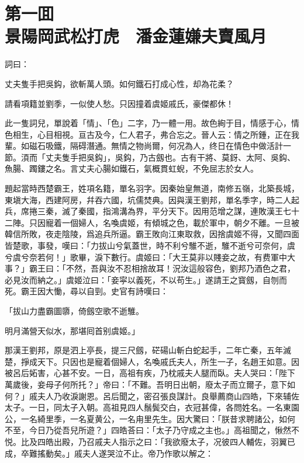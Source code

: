 
\chapter*{第一囬　\\景陽岡武松打虎　潘金蓮嫌夫賣風月}


詞曰：

\begin{myquote}
丈夫隻手把吳鈎，欲斬萬人頭。如何鐵石打成心性，却為花柔？

請看項籍並劉季，一似使人愁。只因撞着虞姬戚氏，豪傑都休！
\end{myquote}

此一隻詞兒，單說着「情」、「色」二字，乃一體一用。故色絢于目，情感于心，情色相生，心目相視。亘古及今，仁人君子，弗合忘之。晉人云：情之所鍾，正在我輩。如磁石吸鐵，隔碍潛通。無情之物尚爾，何况為人，终日在情色中做活計一節。湏而「丈夫隻手把吳鈎」，吳鈎，乃古劔也。古有干將、莫釾、太阿、吳鈎、魚腸、躅鏤之名。言丈夫心腸如鐵石，氣概貫虹蜺，不免屈志於女人。

題起當時西楚霸王，姓項名籍，單名羽字。因秦始皇無道，南修五嶺，北築長城，東塡大海，西建阿房，幷吞六國，坑儒焚典。因與漢王劉邦，單名季字，時二人起兵，席捲三秦，滅了秦國，指鴻溝為界，平分天下。因用范增之謀，連敗漢王七十二陣。只因寵着一個婦人，名喚虞姬，有傾城之色，載於軍中，朝夕不離。一旦被韓信所敗，夜走陰陵，爲追兵所逼。霸王敗向江東取救，因捨虞姬不得，又聞四面皆楚歌，事發，嘆曰：「力拔山兮氣蓋世，時不利兮騅不逝，騅不逝兮可奈何，虞兮虞兮奈若何！」歌畢，淚下數行。虞姬曰：「大王莫非以賤妾之故，有费軍中大事？」霸王曰：「不然，吾與汝不忍相捨故耳！況汝這般容色，劉邦乃酒色之君，必見汝而納之。」虞姬泣曰：「妾寜以義死，不以苟生。」遂請王之寳劔，自刎而死。霸王因大慟，尋以自剄。史官有詩嘆曰：

\begin{myquote}
「拔山力盡霸圖隳，倚劔空歌不逝騅。

明月滿營天似水，那堪囘首别虞姬。」
\end{myquote}

那漢王劉邦，原是泗上亭長，提三尺劔，硭碭山斬白蛇起手，二年亡秦，五年滅楚，掙成天下。只因也是寵着個婦人，名喚戚氏夫人，所生一子，名趙王如意。因被呂后妬害，心甚不安。一日，高祖有疾，乃枕戚夫人腿而臥。夫人哭曰：「陛下萬歲後，妾母子何所托？」帝曰：「不難。吾明日出朝，廢太子而立爾子，意下如何？」戚夫人乃收淚謝恩。呂后聞之，密召張良謀計。良舉薦商山四皓，下來辅佐太子。一日，同太子入朝。高祖見四人鬚鬓交白，衣冠甚偉，各問姓名。一名東園公，一名綺里季，一名夏黄公，一名甪里先生。因大驚曰：「朕昔求聘諸公，如何不至，今日乃從吾兒所遊？」四皓荅曰：「太子乃守成之主也。」高祖聞之，愀然不悦。比及四皓出殿，乃召戚夫人指示之曰：「我欲廢太子，况彼四人輔佐，羽翼已成，卒難搖動矣。」戚夫人遂哭泣不止。帝乃作歌以解之：

